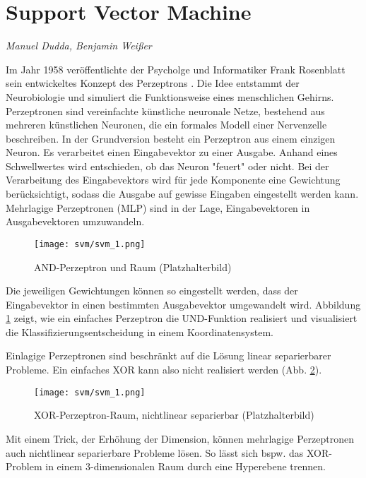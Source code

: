 \section{Support Vector Machine}
\textit{Manuel Dudda, Benjamin Weißer}

Im Jahr 1958 veröffentlichte der Psycholge und Informatiker Frank Rosenblatt sein entwickeltes Konzept des Perzeptrons \cite{rosenblatt58a}. 
Die Idee entstammt der Neurobiologie und simuliert die Funktionsweise eines menschlichen Gehirns. 
Perzeptronen sind vereinfachte künstliche neuronale Netze, bestehend aus mehreren künstlichen Neuronen, die ein formales Modell einer Nervenzelle beschreiben. 
In der Grundversion besteht ein Perzeptron aus einem einzigen Neuron. 
Es verarbeitet einen Eingabevektor zu einer Ausgabe. 
Anhand eines Schwellwertes wird entschieden, ob das Neuron "{}feuert"{} oder nicht. 
Bei der Verarbeitung des Eingabevektors wird für jede Komponente eine Gewichtung berücksichtigt, sodass die Ausgabe auf gewisse Eingaben eingestellt werden kann. 
Mehrlagige Perzeptronen (MLP) sind in der Lage, Eingabevektoren in Ausgabevektoren umzuwandeln. 

\begin{figure}[htbp] \centering
    \texttt{[image: svm/svm\_1.png]}
    \caption{AND-Perzeptron und Raum (Platzhalterbild)}
    \label{fig:perceptron_and}
\end{figure}

Die jeweiligen Gewichtungen können so eingestellt werden, dass der Eingabevektor in einen bestimmten Ausgabevektor umgewandelt wird. 
Abbildung \ref{fig:perceptron_and} zeigt, wie ein einfaches Perzeptron die UND-Funktion realisiert und visualisiert die Klassifizierungsentscheidung in einem Koordinatensystem. 

Einlagige Perzeptronen sind beschränkt auf die Lösung linear separierbarer Probleme. 
Ein einfaches XOR kann also nicht realisiert werden (Abb. \ref{fig:perceptron_xor}). 

\begin{figure}[htbp] \centering
    \texttt{[image: svm/svm\_1.png]}
    \caption{XOR-Perzeptron-Raum, nichtlinear separierbar (Platzhalterbild)}
    \label{fig:perceptron_xor}
\end{figure}


Mit einem Trick, der Erhöhung der Dimension, können mehrlagige Perzeptronen auch nichtlinear separierbare Probleme lösen. 
So lässt sich bspw. das XOR-Problem in einem 3-dimensionalen Raum durch eine Hyperebene trennen.

